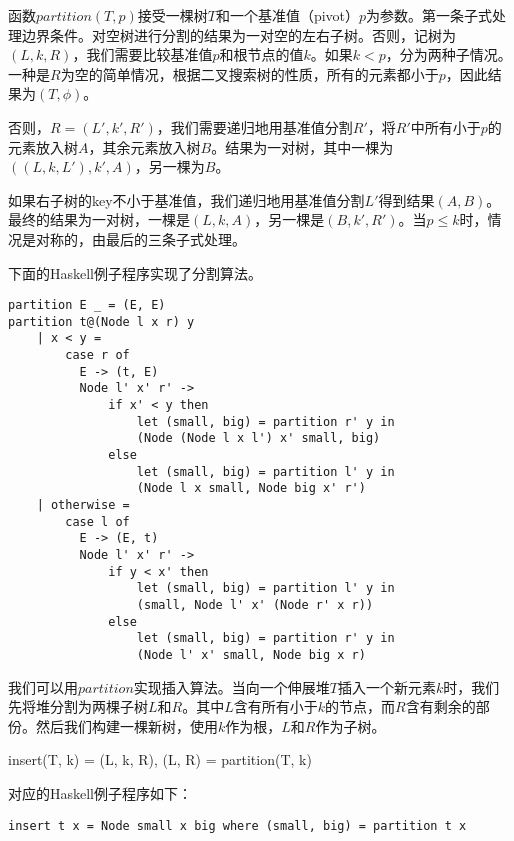 \documentclass[UTF8]{article}
\begin{document}
函数$partition(T, p)$接受一棵树$T$和一个基准值（pivot）$p$为参数。第一条子式处理边界条件。对空树进行分割的结果为一对空的左右子树。否则，记树为$(L, k, R)$，我们需要比较基准值$p$和根节点的值$k$。如果$k < p$，分为两种子情况。一种是$R$为空的简单情况，根据二叉搜索树的性质，所有的元素都小于$p$，因此结果为$(T, \phi)$。

否则，$R = (L', k', R')$，我们需要递归地用基准值分割$R'$，将$R'$中所有小于$p$的元素放入树$A$，其余元素放入树$B$。结果为一对树，其中一棵为$((L, k, L'), k', A)$，另一棵为$B$。

如果右子树的key不小于基准值，我们递归地用基准值分割$L'$得到结果$(A, B)$。最终的结果为一对树，一棵是$(L, k, A)$，另一棵是$(B, k', R')$。当$p \leq k$时，情况是对称的，由最后的三条子式处理。

下面的Haskell例子程序实现了分割算法。

\begin{lstlisting}[style=Haskell]
partition E _ = (E, E)
partition t@(Node l x r) y
    | x < y =
        case r of
          E -> (t, E)
          Node l' x' r' ->
              if x' < y then
                  let (small, big) = partition r' y in
                  (Node (Node l x l') x' small, big)
              else
                  let (small, big) = partition l' y in
                  (Node l x small, Node big x' r')
    | otherwise =
        case l of
          E -> (E, t)
          Node l' x' r' ->
              if y < x' then
                  let (small, big) = partition l' y in
                  (small, Node l' x' (Node r' x r))
              else
                  let (small, big) = partition r' y in
                  (Node l' x' small, Node big x r)
\end{lstlisting}

我们可以用$partition$实现插入算法。当向一个伸展堆$T$插入一个新元素$k$时，我们先将堆分割为两棵子树$L$和$R$。其中$L$含有所有小于$k$的节点，而$R$含有剩余的部份。然后我们构建一棵新树，使用$k$作为根，$L$和$R$作为子树。

\be
insert(T, k) = (L, k, R), (L, R) = partition(T, k)
\ee

对应的Haskell例子程序如下：

\lstset{language=Haskell}
\begin{lstlisting}[style=Haskell]
insert t x = Node small x big where (small, big) = partition t x
\end{lstlisting}
\end{document}
